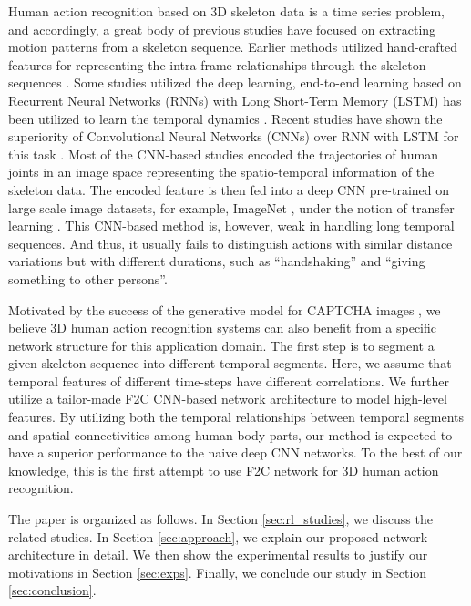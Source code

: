 \documentclass{bmvc2k}
\begin{document}
Human action recognition based on 3D skeleton data is a time series problem, and accordingly, a great body of previous studies have focused on extracting motion patterns from a skeleton sequence. Earlier methods utilized hand-crafted features for representing the intra-frame relationships through the skeleton sequences \cite{yang2014effective, wang2012mining}. Some studies utilized the deep learning, end-to-end learning based on Recurrent Neural Networks (RNNs) with Long Short-Term Memory (LSTM) has been utilized to learn the temporal dynamics \cite{du2015hierarchical, song2017end, zhu2016co, liu2016spatio, shahroudy2016ntu, liu2017skeleton}. Recent studies have shown the superiority of Convolutional Neural Networks (CNNs) over RNN with LSTM for this task \cite{ke2017skeletonnet, liu2017enhanced, ke2017new, liu20173d}. Most of the CNN-based studies encoded the trajectories of human joints in an image space representing the spatio-temporal information of the skeleton data. The encoded feature is then fed into a deep CNN pre-trained on large scale image datasets, for example, ImageNet \cite{ILSVRC15}, under the notion of transfer learning \cite{pan2010survey}. This CNN-based method is, however, weak in handling long temporal sequences. And thus, it usually fails to distinguish actions with similar distance variations but with different durations, such as ``handshaking'' and ``giving something to other persons''. 

Motivated by the success of the generative model for CAPTCHA images  \cite{george2017generative}, we believe 3D human action recognition systems can also benefit from a specific network structure for this application domain. The first step is to segment a given skeleton sequence into different temporal segments. Here, we assume that temporal features of different time-steps have different correlations. We further utilize a tailor-made F2C CNN-based network architecture to model high-level features. By utilizing both the temporal relationships between temporal segments and spatial connectivities among human body parts, our method is expected to have a superior performance to the naive deep CNN networks. To the best of our knowledge, this is the first attempt to use F2C network for 3D human action recognition.

The paper is organized as follows. In Section \ref{sec:rl_studies}, we discuss the related studies. In Section \ref{sec:approach}, we explain our proposed network architecture in detail. We then show the experimental results to justify our motivations in Section \ref{sec:exps}. Finally, we conclude our study in Section \ref{sec:conclusion}.
\end{document}
